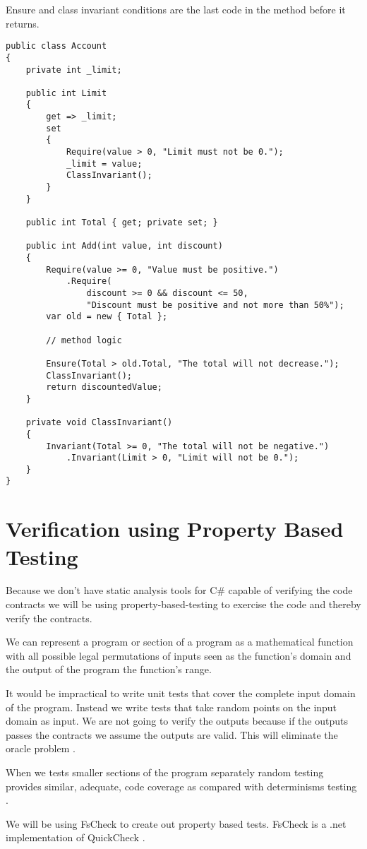 Ensure and class invariant conditions are the last code in the method before it 
returns. 

\begin{lstlisting}[frame=single]
public class Account
{
    private int _limit;

    public int Limit
    {
        get => _limit;
        set
        {
            Require(value > 0, "Limit must not be 0.");
            _limit = value;
            ClassInvariant();
        }
    }

    public int Total { get; private set; }

    public int Add(int value, int discount)
    {
        Require(value >= 0, "Value must be positive.")
            .Require(
                discount >= 0 && discount <= 50, 
                "Discount must be positive and not more than 50%");
        var old = new { Total };

        // method logic

        Ensure(Total > old.Total, "The total will not decrease.");
        ClassInvariant();
        return discountedValue;
    }
    
    private void ClassInvariant()
    {
        Invariant(Total >= 0, "The total will not be negative.")
            .Invariant(Limit > 0, "Limit will not be 0.");
    }
}
\end{lstlisting}


\section{Verification using Property Based Testing}
Because we don't have static analysis tools for C\# capable of verifying the code 
contracts we will be using property-based-testing to exercise the code and thereby 
verify the contracts.

We can represent a program or section of a program as a mathematical function
with all possible legal permutations of inputs seen as the function's domain and 
the output of the program the function's range.

It would be impractical to write unit tests that cover the complete input domain
of the program. Instead we write tests that take random points on the input domain
as input. We are not going to verify the outputs because if the outputs passes the 
contracts we assume the outputs are valid. This will eliminate the oracle problem 
\parencite{QuickCheck}.
 
When we tests smaller sections of the program separately random testing 
provides similar, adequate, code coverage as compared with determinisms testing
\parencite{QuickCheck}\parencite{Hamlet94randomtesting}.

We will be using FsCheck to create out property based tests. FsCheck is a .net 
implementation of QuickCheck \parencite{FsCheck_home}. 


